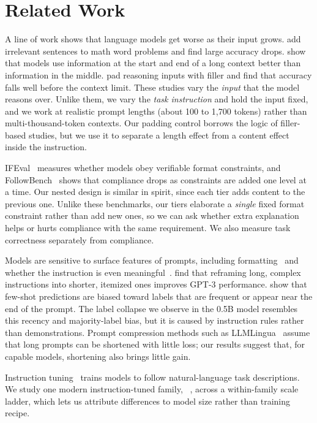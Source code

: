 \section{Related Work}
\label{sec:related}

A line of work shows that language models get worse as their input grows.
\citet{shi2023distracted} add irrelevant sentences to math word problems and find large accuracy drops.
\citet{liu2024lost} show that models use information at the start and end of a long context better than information in the middle.
\citet{levy2024same} pad reasoning inputs with filler and find that accuracy falls well before the context limit.
These studies vary the \emph{input} that the model reasons over.
Unlike them, we vary the \emph{task instruction} and hold the input fixed, and we work at realistic prompt lengths (about 100 to 1{,}700 tokens) rather than multi-thousand-token contexts.
Our padding control borrows the logic of filler-based studies, but we use it to separate a length effect from a content effect inside the instruction.

IFEval~\citep{zhou2023ifeval} measures whether models obey verifiable format constraints, and FollowBench~\citep{jiang2024followbench} shows that compliance drops as constraints are added one level at a time.
Our nested design is similar in spirit, since each tier adds content to the previous one.
Unlike these benchmarks, our tiers elaborate a \emph{single} fixed format constraint rather than add new ones, so we can ask whether extra explanation helps or hurts compliance with the same requirement.
We also measure task correctness separately from compliance.

Models are sensitive to surface features of prompts, including formatting~\citep{sclar2024quantifying} and whether the instruction is even meaningful~\citep{webson2022prompt}.
\citet{mishra2022reframing} find that reframing long, complex instructions into shorter, itemized ones improves GPT-3 performance.
\citet{zhao2021calibrate} show that few-shot predictions are biased toward labels that are frequent or appear near the end of the prompt.
The label collapse we observe in the 0.5B model resembles this recency and majority-label bias, but it is caused by instruction rules rather than demonstrations.
Prompt compression methods such as LLMLingua~\citep{jiang2023llmlingua} assume that long prompts can be shortened with little loss; our results suggest that, for capable models, shortening also brings little gain.

Instruction tuning~\citep{wei2022finetuned,ouyang2022training} trains models to follow natural-language task descriptions.
We study one modern instruction-tuned family, \qwen~\citep{qwen2025qwen25}, across a within-family scale ladder, which lets us attribute differences to model size rather than training recipe.
